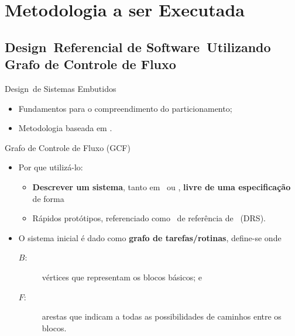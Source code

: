 \section{Metodologia a ser Executada}
   \subsection{Design\ Referencial de Software\ Utilizando Grafo de Controle de Fluxo}
      \begin{frame}{Design\ de Sistemas Embutidos}
         \begin{itemize}  \setlength{\itemsep}{1.6em}
            \item Fundamentos para o compreendimento do particionamento;
            \item Metodologia baseada em \parencite{Sass2010, Arato2003, Arato2005, Mann2007, Hassine2017}.
         \end{itemize}
      \end{frame}
   
      \begin{frame}{Grafo de Controle de Fluxo (GCF)} \vspace{-1em}
         \begin{itemize}
            \setlength{\itemsep}{1.2em}
            \item Por que utilizá-lo:
            \begin{itemize}
               \item \textbf{Descrever um sistema}, tanto em \software\ ou \hardware, \textbf{livre de uma especificação} de forma
               \item Rápidos protótipos, referenciado como \design\ de referência de \software\ (DRS).
            \end{itemize}
   
            \item O sistema inicial é dado como \textbf{grafo de tarefas/rotinas}, define-se  onde
            \begin{description}
               \item [$B$:] vértices que representam os blocos básicos; e 
               \item [$F$:] arestas que indicam a todas as possibilidades de caminhos entre os blocos.
            \end{description}
         \end{itemize}
      \end{frame}
   
